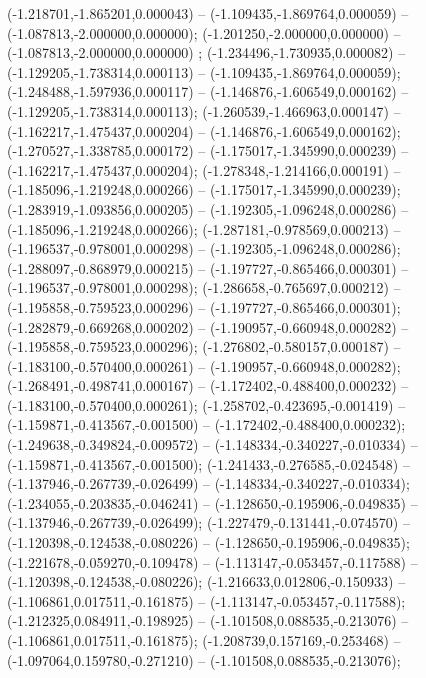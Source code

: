  (-1.218701,-1.865201,0.000043) -- (-1.109435,-1.869764,0.000059) -- (-1.087813,-2.000000,0.000000);
 (-1.201250,-2.000000,0.000000) -- (-1.087813,-2.000000,0.000000) ;
 (-1.234496,-1.730935,0.000082) -- (-1.129205,-1.738314,0.000113) -- (-1.109435,-1.869764,0.000059);
 (-1.248488,-1.597936,0.000117) -- (-1.146876,-1.606549,0.000162) -- (-1.129205,-1.738314,0.000113);
 (-1.260539,-1.466963,0.000147) -- (-1.162217,-1.475437,0.000204) -- (-1.146876,-1.606549,0.000162);
 (-1.270527,-1.338785,0.000172) -- (-1.175017,-1.345990,0.000239) -- (-1.162217,-1.475437,0.000204);
 (-1.278348,-1.214166,0.000191) -- (-1.185096,-1.219248,0.000266) -- (-1.175017,-1.345990,0.000239);
 (-1.283919,-1.093856,0.000205) -- (-1.192305,-1.096248,0.000286) -- (-1.185096,-1.219248,0.000266);
 (-1.287181,-0.978569,0.000213) -- (-1.196537,-0.978001,0.000298) -- (-1.192305,-1.096248,0.000286);
 (-1.288097,-0.868979,0.000215) -- (-1.197727,-0.865466,0.000301) -- (-1.196537,-0.978001,0.000298);
 (-1.286658,-0.765697,0.000212) -- (-1.195858,-0.759523,0.000296) -- (-1.197727,-0.865466,0.000301);
 (-1.282879,-0.669268,0.000202) -- (-1.190957,-0.660948,0.000282) -- (-1.195858,-0.759523,0.000296);
 (-1.276802,-0.580157,0.000187) -- (-1.183100,-0.570400,0.000261) -- (-1.190957,-0.660948,0.000282);
 (-1.268491,-0.498741,0.000167) -- (-1.172402,-0.488400,0.000232) -- (-1.183100,-0.570400,0.000261);
 (-1.258702,-0.423695,-0.001419) -- (-1.159871,-0.413567,-0.001500) -- (-1.172402,-0.488400,0.000232);
 (-1.249638,-0.349824,-0.009572) -- (-1.148334,-0.340227,-0.010334) -- (-1.159871,-0.413567,-0.001500);
 (-1.241433,-0.276585,-0.024548) -- (-1.137946,-0.267739,-0.026499) -- (-1.148334,-0.340227,-0.010334);
 (-1.234055,-0.203835,-0.046241) -- (-1.128650,-0.195906,-0.049835) -- (-1.137946,-0.267739,-0.026499);
 (-1.227479,-0.131441,-0.074570) -- (-1.120398,-0.124538,-0.080226) -- (-1.128650,-0.195906,-0.049835);
 (-1.221678,-0.059270,-0.109478) -- (-1.113147,-0.053457,-0.117588) -- (-1.120398,-0.124538,-0.080226);
 (-1.216633,0.012806,-0.150933) -- (-1.106861,0.017511,-0.161875) -- (-1.113147,-0.053457,-0.117588);
 (-1.212325,0.084911,-0.198925) -- (-1.101508,0.088535,-0.213076) -- (-1.106861,0.017511,-0.161875);
 (-1.208739,0.157169,-0.253468) -- (-1.097064,0.159780,-0.271210) -- (-1.101508,0.088535,-0.213076);
